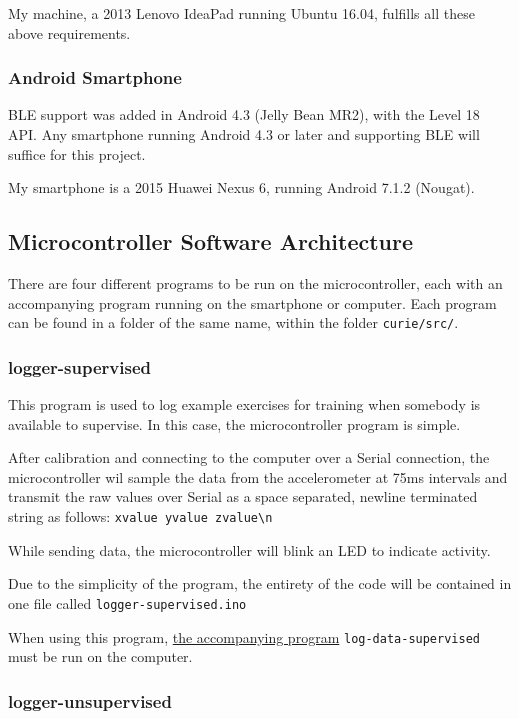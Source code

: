 \documentclass[a4paper]{article}
\begin{document}
My machine, a 2013 Lenovo IdeaPad running Ubuntu 16.04, fulfills all these above requirements.

\subsubsection{Android Smartphone}

BLE support was added in Android 4.3 (Jelly Bean MR2), with the Level 18 API.\cite{dsref6} Any smartphone running Android 4.3 or later and supporting BLE will suffice for this project.

My smartphone is a 2015 Huawei Nexus 6, running Android 7.1.2 (Nougat).

\subsection{Microcontroller Software Architecture}%
\label{subsec:dc_msa}

There are four different programs to be run on the microcontroller, each with an accompanying program running on the smartphone or computer. Each program can be found in a folder of the same name, within the folder \lstinline{curie/src/}.

\subsubsection{logger-supervised}%
\label{subsubsec:dc_msa_loggersupervised}

This program is used to log example exercises for training when somebody is available to supervise. In this case, the microcontroller program is simple.

After calibration and connecting to the computer over a Serial connection, the microcontroller wil sample the data from the accelerometer at 75ms intervals and transmit the raw values over Serial as a space separated, newline terminated string as follows:
\lstinline|xvalue yvalue zvalue\n|

While sending data, the microcontroller will blink an LED to indicate activity.

Due to the simplicity of the program, the entirety of the code will be contained in one file called \lstinline{logger-supervised.ino}

When using this program, \hyperref[subsubsec:dc_csa_logsupervised]{the accompanying program} \lstinline{log-data-supervised} must be run on the computer.

\subsubsection{logger-unsupervised}%
\label{subsubsec:dc_msa_loggerunsupervised}
\end{document}
